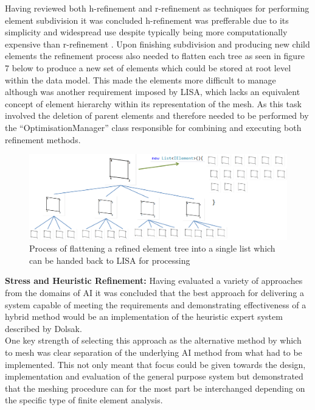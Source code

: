 \noindent
Having reviewed both h-refinement \cite{HandPRefinements} and r-refinement \cite{RRefinement} as techniques for performing element subdivision it was concluded h-refinement was prefferable due to its simplicity and widespread use despite typically being more computationally expensive than r-refinement \cite{HandPRefinements} \cite{RRefinement}. 
Upon finishing subdivision and producing new child elements the refinement process also needed to flatten each tree as seen in figure 7 below to produce a new set of elements which could be stored at root level within the data model. This made the elements more difficult to manage although was another requirement imposed by LISA, which lacks an equivalent concept of element hierarchy within its representation of the mesh. As this task involved the deletion of parent elements and therefore needed to be performed by the ``OptimisationManager'' class responsible for combining and executing both refinement methods. \\

\begin{figure}[!h]
  \centerline{\includegraphics[width=150mm, scale=1]{../Graphics/ElemFlattening.png}}
  \caption{Process of flattening a refined element tree into a single list which can be handed back to LISA for processing}
  \label{fig:h-refinementImp}
\end{figure}

\noindent
\textbf{Stress and Heuristic Refinement: } Having evaluated a variety of approaches from the domains of AI it was concluded that the best approach for delivering a system capable of meeting the requirements and demonstrating effectiveness of a hybrid method would be an implementation of the heuristic expert system described by Dolsak. \\ 

\noindent
One key strength of selecting this approach as the alternative method by which to mesh was clear separation of the underlying AI method from what had to be implemented. This not only meant that focus could be given towards the design, implementation and evaluation of the general purpose system but demonstrated that the meshing procedure can for the most part be interchanged depending on the specific type of finite element analysis. \\ 


